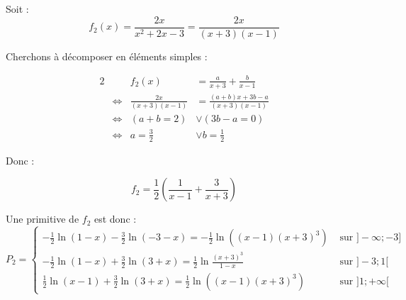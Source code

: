 \documentclass[a4paper,10pt]{report}
\begin{document}
Soit :
\begin{equation*}
		f_2(x) =\frac{2x}{x^2 + 2x -3} = \frac{2x}{(x+3)(x-1)}
\end{equation*}

Cherchons à décomposer en éléments simples :

\begin{alignat*}{2}
	&                     &                f_2(x)  &= \frac{a}{x+3} +  \frac{b}{x-1}\\
	& \Longleftrightarrow & \frac{2x}{(x+3)(x-1)}  &=  \frac{(a+b)x + 3b -a}{(x+3)(x-1)} \\
	& \Longleftrightarrow & (a+b=2)               &\vee (3b-a = 0) \\
	& \Longleftrightarrow & a=\frac{3}{2}        &\vee b = \frac{1}{2}
\end{alignat*}

Donc :

\begin{displaymath}
	f_2 = \frac{1}{2} \left( \frac{1}{x-1} + \frac{3}{x+3} \right)
\end{displaymath}

Une primitive de $f_2$ est donc :
\begin{displaymath}
	P_2 = 
	\begin{cases}
		-\frac{1}{2}\ln(1-x) -\frac{3}{2}\ln(-3-x) = -\frac{1}{2} \ln((x-1)(x+3)^3)      & \text{ sur } ]-\infty ; -3]\\
		-\frac{1}{2}\ln(1-x) +\frac{3}{2}\ln(3+x)  = \frac{1}{2} \ln \frac{(x+3)^3}{1-x} & \text{ sur } ]-3 ; 1[\\
		\frac{1}{2}\ln(x-1) +\frac{3}{2}\ln(3+x)   = \frac{1}{2} \ln((x-1)(x+3)^3)       & \text{ sur } ]1 ; +\infty[
	\end{cases}
\end{displaymath}
\end{document}
